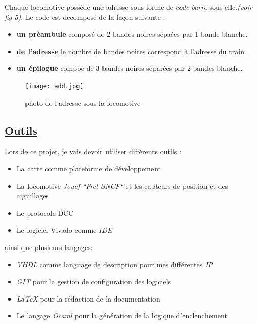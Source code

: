   Chaque locomotive poss\`ede une adresse sous forme de \emph{code
  barre} sous elle.\emph{(voir fig 5)}.
Le code \barre est decompos\'e de la façon suivante :
\begin{itemize}
    \item \textbf{un pr\`eambule} compos\'e de 2 bandes noires
      s\'epa\'ees par 1 bande blanche.
    \item \textbf{de l'adresse} le nombre de bandes noires correspond
      à l'adresse du train. 
    \item \textbf{un  \'epilogue} compo\'e de 3 bandes noires
      s\'epar\'ees par 2 bandes blanche.
\end{itemize}

\begin{figure}[ht]
\centering
\texttt{[image: add.jpg]}
\caption{photo de l'adresse sous la locomotive}
\label{fig6}
\end{figure}

\newpage


\subsection{\underline{ Outils}}
\label{sec:outils}

Lors de ce projet, je vais devoir utiliser diff\'erents outils :
\begin{itemize}
  \item La carte \crt comme plateforme de d\'eveloppement
  \item La locomotive \emph{Jouef ``Fret SNCF``}\cite{Jouef}  et les capteurs de
    position et des aiguillages
  \item Le protocole DCC \cite{DCC}
  \item Le logiciel Vivado comme \emph{IDE}
\end{itemize}

ainsi que plusieurs langages:
\begin{itemize}
  \item \emph{VHDL}\cite{VHDL} comme language de description pour mes diff\'erentes
    \emph{IP}
  \item \emph{GIT}\cite{GIT} pour la gestion de configuration des logiciels
  \item \emph{\LaTeX}\cite{LATEX} pour la r\'edaction de la documentation
  \item Le langage \emph{Ocaml}\cite{OCAML} pour la g\'en\'eration de la logique d'enclenchement
\end{itemize}


